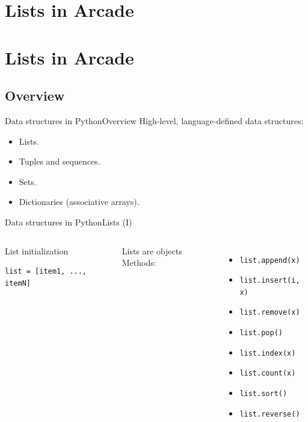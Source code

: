 \documentclass[10pt,compress]{beamer} %
\begin{document}
{}{


\section{Lists in Arcade}

\section{Lists in Arcade}
\subsection{Overview}
\begin{frame}{Data structures in Python}{Overview}
	High-level, language-defined data structures:
	\begin{itemize}
		\item Lists.
		\item Tuples and sequences.
		\item Sets.
		\item Dictionaries (associative arrays).
	\end{itemize}
\end{frame}

\begin{frame}[fragile]{Data structures in Python}{Lists (I)}
    \begin{columns}
	   \begin{block}{List initialization}
	   	\begin{verbatim}
list = [item1, ..., itemN]
\end{verbatim}
	   \end{block}
	   Lists are objects
	Methods:
	\begin{itemize}
		\item \texttt{list.append(x)}
		\item \texttt{list.insert(i, x)}
		\item \texttt{list.remove(x)}
		\item \texttt{list.pop()}
		\item \texttt{list.index(x)}
		\item \texttt{list.count(x)}
		\item \texttt{list.sort()}
		\item \texttt{list.reverse()}
	\end{itemize}
   \end{columns}
\end{frame}

}
\end{document}
